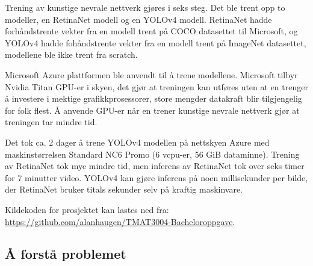 


Trening av kunstige nevrale nettverk gjøres i seks steg. Det ble trent opp to modeller, en RetinaNet modell og en YOLOv4 modell. RetinaNet hadde forhåndstrente vekter fra en modell trent på COCO datasettet til Microsoft, og YOLOv4 hadde fohåndstrente vekter fra en modell trent på ImageNet datasettet, modellene ble ikke trent fra scratch. %

Microsoft Azure plattformen ble anvendt til å trene modellene. Microsoft tilbyr Nvidia Titan GPU-er i skyen, det gjør at treningen kan utføres uten at en trenger å investere i mektige grafikkprosessorer, store mengder datakraft blir tilgjengelig for folk flest. Å anvende GPU-er når en trener kunstige nevrale nettverk gjør at treningen tar mindre tid.

Det tok ca. 2 dager å trene YOLOv4 modellen på nettskyen Azure med maskinstørrelsen Standard NC6 Promo (6 vcpu-er, 56 GiB dataminne). Trening av RetinaNet tok mye mindre tid, men inferens av RetinaNet tok over seks timer for 7 minutter video. YOLOv4 kan gjøre inferens på noen millisekunder per bilde, der RetinaNet bruker titals sekunder selv på kraftig maskinvare.%

Kildekoden for prosjektet kan lastes ned fra: \\ \url{https://github.com/alanhaugen/TMAT3004-Bacheloroppgave}.

\subsection{Å forstå problemet}

